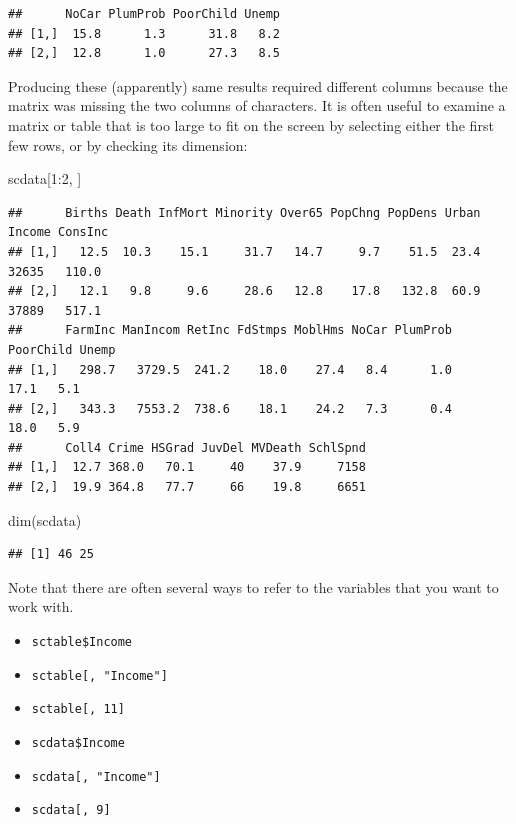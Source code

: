 \documentclass[
]{book}
\newenvironment{Shaded}{\begin{snugshade}}{\end{snugshade}}
\newcommand{\DecValTok}[1]{\textcolor[rgb]{0.00,0.00,0.81}{#1}}
\newcommand{\FunctionTok}[1]{\textcolor[rgb]{0.00,0.00,0.00}{#1}}
\newcommand{\NormalTok}[1]{#1}
\newcommand{\SpecialCharTok}[1]{\textcolor[rgb]{0.00,0.00,0.00}{#1}}
\providecommand{\tightlist}{%
  \setlength{\itemsep}{0pt}\setlength{\parskip}{0pt}}
\begin{document}
\begin{verbatim}
##      NoCar PlumProb PoorChild Unemp
## [1,]  15.8      1.3      31.8   8.2
## [2,]  12.8      1.0      27.3   8.5
\end{verbatim}

Producing these (apparently) same results required different columns because the matrix was missing the two columns of characters. It is often useful to examine a matrix or table that is too large to fit on the screen by selecting either the first few rows, or by checking its dimension:

\begin{Shaded}
\begin{Highlighting}[]
\NormalTok{scdata[}\DecValTok{1}\SpecialCharTok{:}\DecValTok{2}\NormalTok{, ]}
\end{Highlighting}
\end{Shaded}

\begin{verbatim}
##      Births Death InfMort Minority Over65 PopChng PopDens Urban Income ConsInc
## [1,]   12.5  10.3    15.1     31.7   14.7     9.7    51.5  23.4  32635   110.0
## [2,]   12.1   9.8     9.6     28.6   12.8    17.8   132.8  60.9  37889   517.1
##      FarmInc ManIncom RetInc FdStmps MoblHms NoCar PlumProb PoorChild Unemp
## [1,]   298.7   3729.5  241.2    18.0    27.4   8.4      1.0      17.1   5.1
## [2,]   343.3   7553.2  738.6    18.1    24.2   7.3      0.4      18.0   5.9
##      Coll4 Crime HSGrad JuvDel MVDeath SchlSpnd
## [1,]  12.7 368.0   70.1     40    37.9     7158
## [2,]  19.9 364.8   77.7     66    19.8     6651
\end{verbatim}

\begin{Shaded}
\begin{Highlighting}[]
\FunctionTok{dim}\NormalTok{(scdata)}
\end{Highlighting}
\end{Shaded}

\begin{verbatim}
## [1] 46 25
\end{verbatim}

Note that there are often several ways to refer to the variables that you want to work with.

\begin{itemize}
\tightlist
\item
  \texttt{sctable\$Income}
\item
  \texttt{sctable{[},\ "Income"{]}}
\item
  \texttt{sctable{[},\ 11{]}}
\item
  \texttt{scdata\$Income}
\item
  \texttt{scdata{[},\ "Income"{]}}
\item
  \texttt{scdata{[},\ 9{]}}
\end{itemize}
\end{document}
